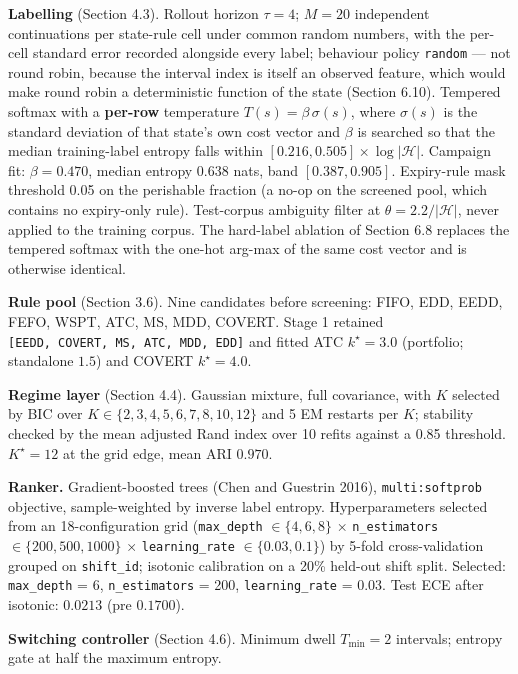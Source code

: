 \documentclass[review,3p,times]{elsarticle}
\theoremstyle{definition}
\begin{document}
\textbf{Labelling} (Section 4.3). Rollout horizon \(\tau = 4\);
\(M = 20\) independent continuations per state-rule cell under common
random numbers, with the per-cell standard error recorded alongside
every label; behaviour policy \texttt{random} --- not round robin,
because the interval index is itself an observed feature, which would
make round robin a deterministic function of the state (Section 6.10).
Tempered softmax with a \textbf{per-row} temperature
\(T(s) = \beta\,\sigma(s)\), where \(\sigma(s)\) is the standard
deviation of that state's own cost vector and \(\beta\) is searched so
that the median training-label entropy falls within
\([0.216, 0.505] \times \log|\mathcal{H}|\). Campaign fit:
\(\beta=0.470\), median entropy \(0.638\) nats, band \([0.387, 0.905]\).
Expiry-rule mask threshold 0.05 on the perishable fraction (a no-op on
the screened pool, which contains no expiry-only rule). Test-corpus
ambiguity filter at \(\theta = 2.2/|\mathcal{H}|\), never applied to the
training corpus. The hard-label ablation of Section 6.8 replaces the
tempered softmax with the one-hot arg-max of the same cost vector and is
otherwise identical.

\textbf{Rule pool} (Section 3.6). Nine candidates before screening:
FIFO, EDD, EEDD, FEFO, WSPT, ATC, MS, MDD, COVERT. Stage 1 retained
\texttt{{[}EEDD,\ COVERT,\ MS,\ ATC,\ MDD,\ EDD{]}} and fitted ATC
\(k^\star=3.0\) (portfolio; standalone \(1.5\)) and COVERT
\(k^\star=4.0\).

\textbf{Regime layer} (Section 4.4). Gaussian mixture, full covariance,
with \(K\) selected by BIC over \(K \in \{2,3,4,5,6,7,8,10,12\}\) and 5
EM restarts per \(K\); stability checked by the mean adjusted Rand index
over 10 refits against a 0.85 threshold. \(K^\star=12\) at the grid
edge, mean ARI \(0.970\).

\textbf{Ranker.} Gradient-boosted trees (Chen and Guestrin 2016),
\texttt{multi:softprob} objective, sample-weighted by inverse label
entropy. Hyperparameters selected from an 18-configuration grid
(\texttt{max\_depth} \(\in \{4,6,8\}\) × \texttt{n\_estimators} \(\in
\{200,500,1000\}\) × \texttt{learning\_rate} \(\in \{0.03,0.1\}\)) by
5-fold cross-validation grouped on \texttt{shift\_id}; isotonic
calibration on a 20\% held-out shift split. Selected:
\texttt{max\_depth} = 6, \texttt{n\_estimators} = 200,
\texttt{learning\_rate} = 0.03. Test ECE after isotonic: \(0.0213\) (pre
\(0.1700\)).

\textbf{Switching controller} (Section 4.6). Minimum dwell
\(T_{\min} = 2\) intervals; entropy gate at half the maximum entropy.
\end{document}
